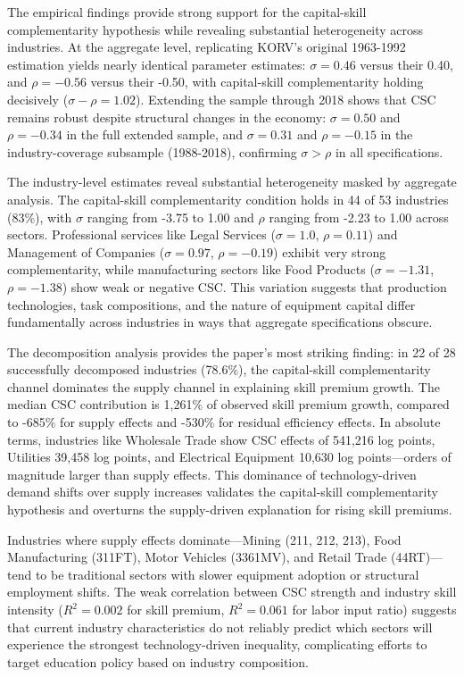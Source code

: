 \documentclass[12pt]{article}
\begin{document}
The empirical findings provide strong support for the capital-skill complementarity hypothesis while revealing substantial heterogeneity across industries. At the aggregate level, replicating KORV's original 1963-1992 estimation yields nearly identical parameter estimates: $\sigma = 0.46$ versus their 0.40, and $\rho = -0.56$ versus their -0.50, with capital-skill complementarity holding decisively ($\sigma - \rho = 1.02$). Extending the sample through 2018 shows that CSC remains robust despite structural changes in the economy: $\sigma = 0.50$ and $\rho = -0.34$ in the full extended sample, and $\sigma = 0.31$ and $\rho = -0.15$ in the industry-coverage subsample (1988-2018), confirming $\sigma > \rho$ in all specifications.

The industry-level estimates reveal substantial heterogeneity masked by aggregate analysis. The capital-skill complementarity condition holds in 44 of 53 industries (83\%), with $\sigma$ ranging from -3.75 to 1.00 and $\rho$ ranging from -2.23 to 1.00 across sectors. Professional services like Legal Services ($\sigma = 1.0$, $\rho = 0.11$) and Management of Companies ($\sigma = 0.97$, $\rho = -0.19$) exhibit very strong complementarity, while manufacturing sectors like Food Products ($\sigma = -1.31$, $\rho = -1.38$) show weak or negative CSC. This variation suggests that production technologies, task compositions, and the nature of equipment capital differ fundamentally across industries in ways that aggregate specifications obscure.

The decomposition analysis provides the paper's most striking finding: in 22 of 28 successfully decomposed industries (78.6\%), the capital-skill complementarity channel dominates the supply channel in explaining skill premium growth. The median CSC contribution is 1,261\% of observed skill premium growth, compared to -685\% for supply effects and -530\% for residual efficiency effects. In absolute terms, industries like Wholesale Trade show CSC effects of 541,216 log points, Utilities 39,458 log points, and Electrical Equipment 10,630 log points---orders of magnitude larger than supply effects. This dominance of technology-driven demand shifts over supply increases validates the capital-skill complementarity hypothesis and overturns the supply-driven explanation for rising skill premiums.

Industries where supply effects dominate---Mining (211, 212, 213), Food Manufacturing (311FT), Motor Vehicles (3361MV), and Retail Trade (44RT)---tend to be traditional sectors with slower equipment adoption or structural employment shifts. The weak correlation between CSC strength and industry skill intensity ($R^2 = 0.002$ for skill premium, $R^2 = 0.061$ for labor input ratio) suggests that current industry characteristics do not reliably predict which sectors will experience the strongest technology-driven inequality, complicating efforts to target education policy based on industry composition.
\end{document}
